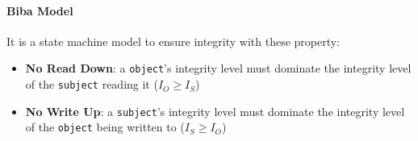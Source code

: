 \paragraph{Biba Model}
It is a state machine model to ensure integrity with these property:
\begin{itemize}
    \item \textbf{No Read Down}: a \texttt{object}'s integrity level must dominate the integrity level of the \texttt{subject} reading it ($I_O \geq I_S$)
    \item \textbf{No Write Up}: a \texttt{subject}'s integrity level must dominate the integrity level of the \texttt{object} being written to ($I_S \geq I_O$)
\end{itemize}